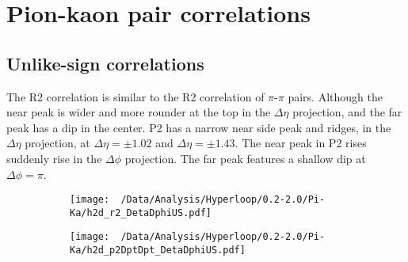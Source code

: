 \documentclass[12pt,a4paper,twoside]{report}
\begin{document}
\section{Pion-kaon pair correlations}
\subsection{Unlike-sign correlations}
The R2 correlation is similar to the R2 correlation of $\pi$-$\pi$ pairs. Although the near peak is wider and more rounder at the top in the $\Delta\eta$ projection, and the far peak has a dip in the center. P2 has a narrow near side peak and ridges, in the $\Delta\eta$ projection, at $\Delta\eta=\pm1.02$ and $\Delta\eta=\pm1.43$. The near peak in P2 rises suddenly rise in the $\Delta\phi$ projection. The far peak features a shallow dip at $\Delta\phi=\pi$.
\begin{figure}[H]
	\begin{subfigure}{0.49\linewidth}
		\texttt{[image: ~/Data/Analysis/Hyperloop/0.2-2.0/Pi-Ka/h2d\_r2\_DetaDphiUS.pdf]}\\
	\end{subfigure}
	\begin{subfigure}{0.49\linewidth}
		\texttt{[image: ~/Data/Analysis/Hyperloop/0.2-2.0/Pi-Ka/h2d\_p2DptDpt\_DetaDphiUS.pdf]}\\
	\end{subfigure}
\end{figure}
\end{document}
